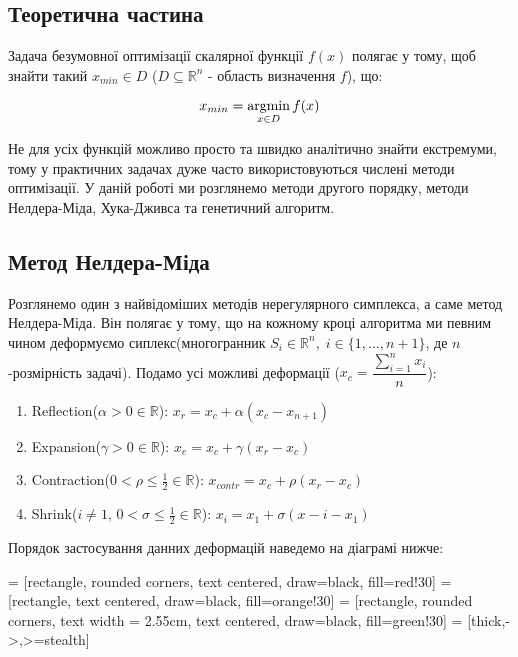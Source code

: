 \begin{center}
    \section*{Теоретична частина}
\end{center}

Задача безумовної оптимізації скалярної функції $f(x)$
полягає у тому, щоб знайти такий $x_{min} \in D$
($ D \subseteq \mathbb{R}^n $ - область визначення $f$), що:

\begin{equation} \label{eq:optimization_task}
    x_{min} = \mathop{\mathrm{argmin}}\limits_{x \in D} f(x)
\end{equation}

Не для усіх функцій можливо просто та швидко
аналітично знайти екстремуми, тому у практичних
задачах дуже часто використовуються числені методи
оптимізації. У даній роботі ми розглянемо методи другого порядку,
методи Нелдера-Міда, Хука-Дживса та генетичний алгоритм.

\subsection*{Метод Нелдера-Міда}

Розглянемо один з найвідоміших методів нерегулярного симплекса,
а саме метод Нелдера-Міда. Він полягає у тому, що на кожному кроці
алгоритма ми певним чином деформуємо сиплекс(многогранник
$S_i \in \mathbb{R}^{n},\; i \in \{1,\dots,n+1\}$, де $n$-розмірність задачі).
Подамо усі можливі деформації ($x_c = \dfrac{\sum\limits_{i=1}^{n} x_i}{n}$):
\begin{enumerate}
    \item Reflection($\alpha > 0 \in \mathbb{R}$):
    $ x_r = x_c + \alpha(x_c - x_{n+1}) $
    \item Expansion($\gamma > 0 \in \mathbb{R}$):
    $ x_e = x_c + \gamma (x_r - x_c) $
    \item Contraction($0 < \rho \leq \frac{1}{2} \in \mathbb{R}$):
    $ x_{contr} = x_c + \rho (x_r - x_c) $
    \item Shrink($i \neq 1$, $0 < \sigma  \leq \frac{1}{2} \in \mathbb{R}$): $x_i = x_1 + \sigma(x-i - x_1)$
\end{enumerate}
Порядок застосування данних деформацій наведемо на діаграмі нижче:

\usetikzlibrary{shapes.geometric, arrows}
 = [rectangle, rounded corners, text centered, draw=black, fill=red!30]
 = [rectangle, text centered, draw=black, fill=orange!30]
 = [rectangle, rounded corners, text width = 2.55cm, text centered, draw=black, fill=green!30]
 = [thick,->,>=stealth]

